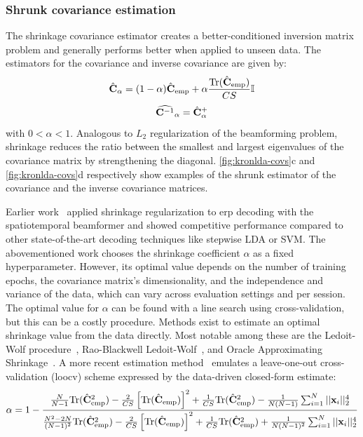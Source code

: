 	\subsubsection{Shrunk covariance estimation}
	\label{sec:shrunk_covariance}
	The shrinkage covariance estimator creates a better-conditioned inversion matrix problem and generally performs better when applied to unseen data.
	The estimators for the covariance and inverse covariance are given by:
	\begin{equation}
    \hat{\mathbf{C}}_\alpha =
    (1-\alpha) \hat{\mathbf{C}}_\text{emp}
    + \alpha\frac{\text{Tr}(\hat{\mathbf{C}}_\text{emp})}{CS}\mathbb{I}
		\label{eq:shrinkage}
	\end{equation}
	\begin{equation}
    \widehat{\mathbf{C}^{-1}}_\alpha =
    \hat{\mathbf{C}}^+_\alpha
		\label{eq:shrinkage_inverse}
	\end{equation}
	with $0<\alpha<1$.
	Analogous to $L_2$ regularization of the beamforming problem,
	shrinkage reduces the ratio between the smallest and largest eigenvalues
	of the covariance matrix by strengthening the diagonal.
	\cref{fig:kronlda-covs}c and \cref{fig:kronlda-covs}d respectively show examples of the
	shrunk estimator of the covariance and the inverse covariance matrices.

	Earlier work~\cite{Libert2021} applied shrinkage regularization to \ac{erp}
	decoding with the spatiotemporal beamformer and showed competitive performance
	compared to other state-of-the-art decoding techniques like stepwise LDA or SVM.
	The abovementioned work chooses the shrinkage coefficient $\alpha$ as a fixed hyperparameter.
	However, its optimal value depends on the number of training epochs, the
	covariance matrix's dimensionality, and the independence and variance of the
	data, which can vary across evaluation settings and per session.
	The optimal value for $\alpha$ can be found with a line search using cross-validation, but this can be a costly procedure.
	Methods exist to estimate an optimal shrinkage value from the data directly.
	Most notable among these are the Ledoit-Wolf procedure~\cite{Ledoit2004},
	Rao-Blackwell Ledoit-Wolf~\cite{Chen2010}, and Oracle Approximating Shrinkage~\cite{Chen2010}.
	A more recent estimation method~\cite{Tong2018} emulates a leave-one-out
	cross-validation (\ac{loocv}) scheme expressed by the data-driven closed-form
	estimate:
	\begin{equation}
		\alpha =
		1-\frac{
      \frac{N}{N-1}\text{Tr}(\hat{\mathbf{C}}_\text{emp}^2)
      - \frac{2}{CS}\left[\text{Tr}(\hat{\mathbf{C}}_\text{emp})\right]^2
      + \frac{1}{CS}\text{Tr}(\hat{\mathbf{C}}_\text{emp}^2)
			- \frac{1}{N(N-1)}\sum_{i=1}^N||\mathbf{x}_i||_2^4
		}
		{
      \frac{N^2 -2N}{(N-1)^2}\text{Tr}(\hat{\mathbf{C}}_\text{emp}^2)
      - \frac{2}{CS}\left[\text{Tr}(\hat{\mathbf{C}}_\text{emp})\right]^2
      + \frac{1}{CS}\text{Tr}(\hat{\mathbf{C}}_\text{emp}^2)
			+ \frac{1}{N(N-1)^2}\sum_{i=1}^N||\mathbf{x}_i||_2^4
		}
		\label{eq:loocv}
	\end{equation}

